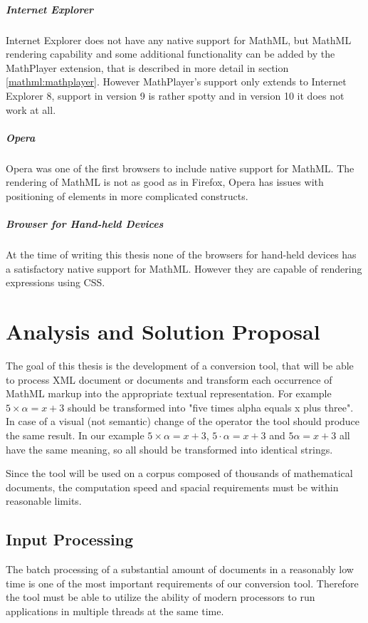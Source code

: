 \documentclass[11pt,oneside,final]{fithesis2}
\begin{document}
\paragraph*{Internet Explorer}
Internet Explorer does not have any native support for MathML, but MathML rendering capability and some additional functionality can be added by the MathPlayer extension, that is described in more detail in section \ref{mathml:mathplayer}. However MathPlayer's support only extends to Internet Explorer 8, support in version 9 is rather spotty and in version 10 it does not work at all.

\paragraph*{Opera}
Opera was one of the first browsers to include native support for MathML. The rendering of MathML is not as good as in Firefox, Opera has issues with positioning of elements in more complicated constructs. 

\paragraph*{Browser for Hand-held Devices}
At the time of writing this thesis none of the browsers for hand-held devices has a satisfactory native support for MathML. However they are capable of rendering expressions using CSS.

\chapter{Analysis and Solution Proposal}
The goal of this thesis is the development of a conversion tool, that will be able to process XML document or documents and transform each occurrence of MathML markup into the appropriate textual representation. For example $5 \times \alpha = x + 3$ should be transformed into "five times alpha equals x plus three". In case of a visual (not semantic) change of the operator the tool should produce the same result. In our example $5 \times \alpha = x + 3$, $5 \cdot \alpha = x + 3$ and $5\alpha = x + 3$ all have the same meaning, so all should be transformed into identical strings.

Since the tool will be used on a corpus composed of thousands of mathematical documents, the computation speed and spacial requirements must be within reasonable limits. 


\section{Input Processing}
The batch processing of a substantial amount of documents in a reasonably low time is one of the most important requirements of our conversion tool. Therefore the tool must be able to utilize the ability of modern processors to run applications in multiple threads at the same time. 
\end{document}
